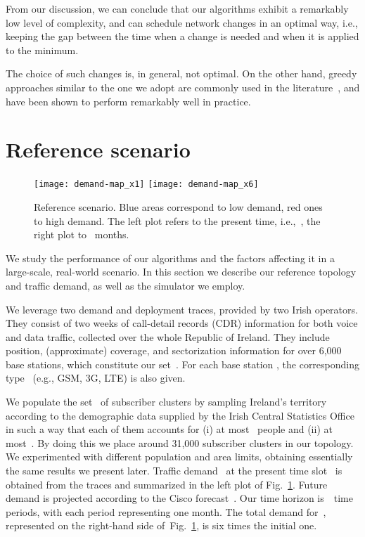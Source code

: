 \documentclass[10pt,journal,cspaper,compsoc]{IEEEtran}
\newcommand{\Fig}[1]{Fig.~\ref{fig:#1}}
\begin{document}
From our discussion, we can conclude that our algorithms exhibit a remarkably low level of complexity, and can schedule
network changes in an optimal way, i.e., keeping the gap between the time when a change is needed and when it is applied to the
minimum.

The choice of such changes is, in general, not optimal. On the other hand, greedy approaches similar to
the one we adopt are commonly used in the literature~\cite{inapprox}, and have been shown to perform remarkably well in practice.

\section{Reference scenario}
\label{sec:scenario}

\begin{figure}
\centering
\texttt{[image: demand-map\_x1]}
\texttt{[image: demand-map\_x6]}
\caption{
Reference scenario. Blue areas correspond to low demand, red ones to high demand.
The left plot refers to the present time, i.e.,~, the right plot to~
months.
\label{fig:scenario}
}
\end{figure}
We study the performance of our algorithms and the factors affecting it in a large-scale, real-world scenario.
In this section we describe our reference topology and traffic demand, as well as the simulator we employ.

We leverage two demand and deployment traces, provided by two Irish operators. They consist of two weeks of call-detail records (CDR) information for both voice and data traffic, collected over the whole Republic of Ireland. They include position, (approximate) coverage, and sectorization information for over 6,000 base stations, which constitute our set~. For each base station , the corresponding type~ (e.g., GSM, 3G, LTE) is also given.

We populate the set~ of subscriber clusters by sampling Ireland's territory
according to the demographic data supplied by the Irish Central Statistics
Office~\cite{census2011} in such a way that each of 
them accounts for (i) at most~ people and (ii) at most~. By doing this we place around
31,000 subscriber clusters in our topology.
We experimented with different population and area limits, obtaining essentially the same
results we present later.
Traffic demand~ at the present time slot~ is obtained
from the traces and summarized in the left plot of \Fig{scenario}.
Future demand is projected according to the Cisco forecast~\cite{cisco}. Our time horizon is~~time 
periods, with each period representing one month. The total demand for~, represented on the right-hand 
side of~\Fig{scenario}, is six times the initial one.
\end{document}
